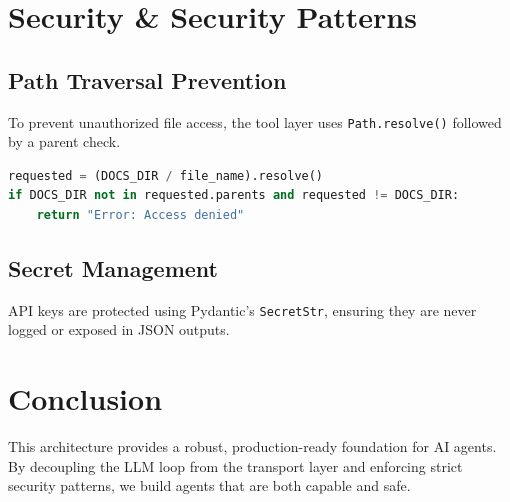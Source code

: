 \documentclass[11pt,a4paper]{report}
\begin{document}
\chapter{Security \& Security Patterns}

\section{Path Traversal Prevention}
To prevent unauthorized file access, the tool layer uses \texttt{Path.resolve()} followed by a parent check.
\begin{lstlisting}[language=Python]
requested = (DOCS_DIR / file_name).resolve()
if DOCS_DIR not in requested.parents and requested != DOCS_DIR:
    return "Error: Access denied"
\end{lstlisting}

\section{Secret Management}
API keys are protected using Pydantic's \texttt{SecretStr}, ensuring they are never logged or exposed in JSON outputs.

\chapter{Conclusion}
This architecture provides a robust, production-ready foundation for AI agents. By decoupling the LLM loop from the transport layer and enforcing strict security patterns, we build agents that are both capable and safe.
\end{document}
